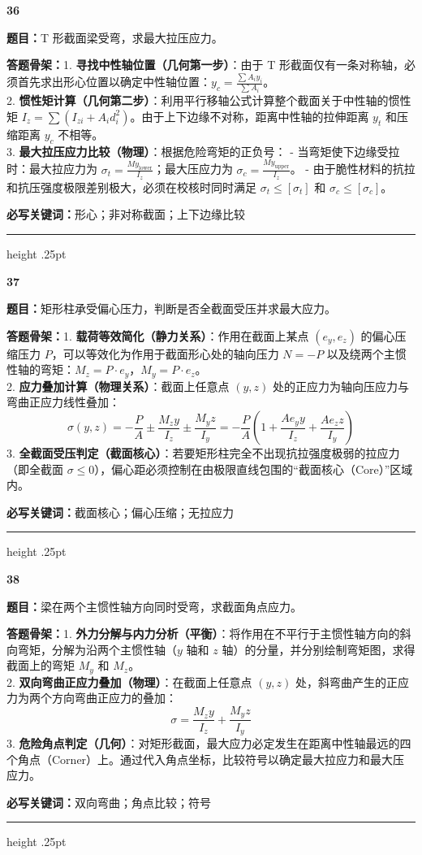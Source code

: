 \documentclass[a4paper,10pt]{article}
\newcommand{\qitem}[5]{%
\Needspace{6\baselineskip}
\vspace{3pt}
{\Large\bfseries\color{deep} #1}\quad{\bfseries\color{orangea}#2}\par
\textbf{题目：}#3\par
\textbf{答题骨架：}#4\par
\textbf{必写关键词：}{\color{bluea}#5}\par
\vspace{2pt}\hrule height .25pt
}
\begin{document}
\qitem{36}{T 形截面弯曲}
{T 形截面梁受弯，求最大拉压应力。}
{1. \textbf{寻找中性轴位置（几何第一步）}：由于 T 形截面仅有一条对称轴，必须首先求出形心位置以确定中性轴位置：\(y_c = \frac{\sum A_i y_i}{\sum A_i}\)。\\
2. \textbf{惯性矩计算（几何第二步）}：利用平行移轴公式计算整个截面关于中性轴的惯性矩 \(I_z = \sum (I_{zi} + A_i d_i^2)\)。由于上下边缘不对称，距离中性轴的拉伸距离 \(y_t\) 和压缩距离 \(y_c\) 不相等。\\
3. \textbf{最大拉压应力比较（物理）}：根据危险弯矩的正负号：
   - 当弯矩使下边缘受拉时：最大拉应力为 \(\sigma_t = \frac{M y_{\text{lower}}}{I_z}\)；最大压应力为 \(\sigma_c = \frac{M y_{\text{upper}}}{I_z}\)。
   - 由于脆性材料的抗拉和抗压强度极限差别极大，必须在校核时同时满足 \(\sigma_t \le [\sigma_t]\) 和 \(\sigma_c \le [\sigma_c]\)。}
{形心；非对称截面；上下边缘比较}

\qitem{37}{偏心压缩矩形柱}
{矩形柱承受偏心压力，判断是否全截面受压并求最大应力。}
{1. \textbf{载荷等效简化（静力关系）}：作用在截面上某点 \((e_y, e_z)\) 的偏心压缩压力 \(P\)，可以等效化为作用于截面形心处的轴向压力 \(N = -P\) 以及绕两个主惯性轴的弯矩：\(M_z = P \cdot e_y\)，\(M_y = P \cdot e_z\)。\\
2. \textbf{应力叠加计算（物理关系）}：截面上任意点 \((y, z)\) 处的正应力为轴向压应力与弯曲正应力线性叠加：
   \[ \sigma(y, z) = -\frac{P}{A} \pm \frac{M_z y}{I_z} \pm \frac{M_y z}{I_y} = -\frac{P}{A} \left( 1 + \frac{A e_y y}{I_z} + \frac{A e_z z}{I_y} \right) \]
3. \textbf{全截面受压判定（截面核心）}：若要矩形柱完全不出现抗拉强度极弱的拉应力（即全截面 \(\sigma \le 0\)），偏心距必须控制在由极限直线包围的“截面核心（Core）”区域内。}
{截面核心；偏心压缩；无拉应力}

\qitem{38}{斜弯曲梁}
{梁在两个主惯性轴方向同时受弯，求截面角点应力。}
{1. \textbf{外力分解与内力分析（平衡）}：将作用在不平行于主惯性轴方向的斜向弯矩，分解为沿两个主惯性轴（\(y\) 轴和 \(z\) 轴）的分量，并分别绘制弯矩图，求得截面上的弯矩 \(M_y\) 和 \(M_z\)。\\
2. \textbf{双向弯曲正应力叠加（物理）}：在截面上任意点 \((y, z)\) 处，斜弯曲产生的正应力为两个方向弯曲正应力的叠加：
   \[ \sigma = \frac{M_z y}{I_z} + \frac{M_y z}{I_y} \]
3. \textbf{危险角点判定（几何）}：对矩形截面，最大应力必定发生在距离中性轴最远的四个角点（Corner）上。通过代入角点坐标，比较符号以确定最大拉应力和最大压应力。}
{双向弯曲；角点比较；符号}
\end{document}
